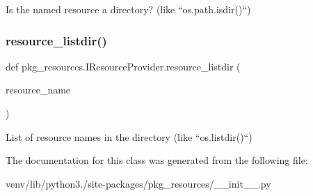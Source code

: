 \begin{DoxyVerb}Is the named resource a directory?  (like ``os.path.isdir()``)\end{DoxyVerb}
 \mbox{\label{classpkg__resources_1_1_i_resource_provider_a641c57dcce0cf87c1c58d64b4528d695}} 
\subsubsection{\texorpdfstring{resource\+\_\+listdir()}{resource\_listdir()}}
{\footnotesize\ttfamily def pkg\+\_\+resources.\+I\+Resource\+Provider.\+resource\+\_\+listdir (\begin{DoxyParamCaption}\item[{}]{resource\+\_\+name }\end{DoxyParamCaption})}

\begin{DoxyVerb}List of resource names in the directory (like ``os.listdir()``)\end{DoxyVerb}
 

The documentation for this class was generated from the following file\+:\begin{DoxyCompactItemize}
\item 
venv/lib/python3./site-\/packages/pkg\+\_\+resources/\+\_\+\+\_\+init\+\_\+\+\_\+.\+py\end{DoxyCompactItemize}

